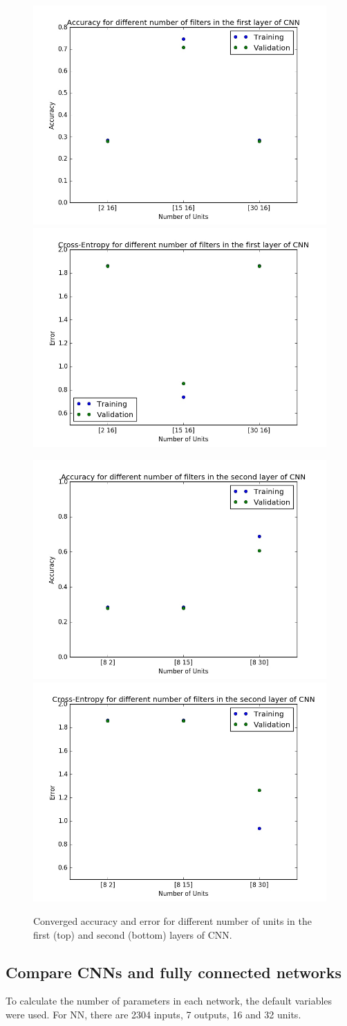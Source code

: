 \documentclass[12pt]{article}
\begin{document}
\begin{figure}[!htb]
\centering
\includegraphics[width=0.4\linewidth]{33/cnn/1Accuracy.jpg}
\includegraphics[width=0.4\linewidth]{33/cnn/1Error.jpg}

\includegraphics[width=0.4\linewidth]{33/cnn/2Accuracy.jpg}
\includegraphics[width=0.4\linewidth]{33/cnn/2Error.jpg}
\vspace{-0.1in}
\caption{Converged accuracy and error for different number of units in the first (top) and second (bottom) layers of CNN.}
\label{f33cnn}
\vspace{-0.1in}
\end{figure}

\subsection{Compare CNNs and fully connected networks}
To calculate the number of parameters in each network, the default variables were used. For NN, there are 2304 inputs, 7 outputs, 16 and 32 units.
\end{document}
